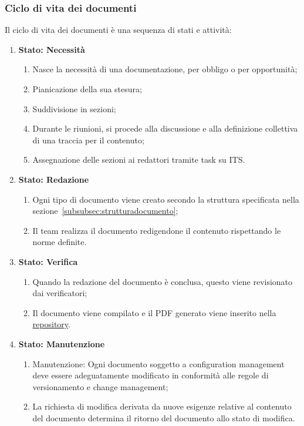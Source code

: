 \subsubsection{Ciclo di vita dei documenti}
Il ciclo di vita dei documenti è una sequenza di stati e attività:
\begin{enumerate}
    \item \textbf{Stato: Necessità}
          \begin{enumerate}
              \item Nasce la necessità di una documentazione, per obbligo o per opportunità;
              \item Pianicazione della sua stesura;
              \item Suddivisione in sezioni;
              \item Durante le riunioni, si procede alla discussione e alla definizione collettiva di una traccia per il contenuto;
              \item Assegnazione delle sezioni ai redattori tramite task su ITS. 
          \end{enumerate}
    \item \textbf{Stato: Redazione}
          \begin{enumerate}
              \item  Ogni tipo di documento viene creato secondo la struttura specificata nella sezione~\ref{subsubsec:strutturadocumento};
              \item Il team realizza il documento redigendone il contenuto rispettando le norme definite.
          \end{enumerate}
    \item \textbf{Stato: Verifica}
          \begin{enumerate}
              \item Quando la redazione del documento è conclusa, questo viene revisionato dai verificatori;
              \item Il documento viene compilato e il PDF generato viene inserito nella \href{https://github.com/ByteOps-swe/Documents}{repository}.
          \end{enumerate}
    \item \textbf{Stato: Manutenzione}
          \begin{enumerate}
              \item Manutenzione: Ogni documento soggetto a configuration management deve essere adeguatamente modificato in conformità alle regole di versionamento e change management;
              \item La richiesta di modifica derivata da nuove esigenze relative al contenuto del documento determina il ritorno del documento allo stato di modifica.
          \end{enumerate}
\end{enumerate}

